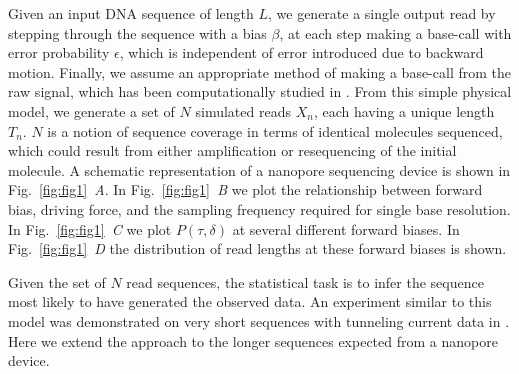 \documentclass{biophys_letter}
\newcommand{\bias}{\beta}
\newcommand{\err}{\epsilon}
\newcommand{\kje}[1]{\textcolor{BurntOrange}{#1}}
\begin{document}
\begin{multicols}{2}
Given an input DNA sequence of length $L$, we generate a single output read by stepping through the sequence with a bias $\bias$, at each step making a base-call with error probability $\err$, which is independent of error introduced due to backward motion.
Finally, we assume an appropriate method of making a base-call from the raw signal, which has been computationally studied in \cite{ODonnell:2013}.
From this simple physical model, we generate a set of $N$ simulated reads $X_n$, each having a unique length $T_{n}$.
$N$ is a notion of sequence coverage in terms of identical molecules sequenced, which could result from either amplification or resequencing of the initial molecule.
A schematic representation of a nanopore sequencing device is shown in Fig.~\ref{fig:fig1}\emph{~A}.
\kje{
In Fig.~\ref{fig:fig1}\emph{~B} we plot the relationship between forward bias, driving force, and the sampling frequency required for single base resolution.
In Fig.~\ref{fig:fig1}\emph{~C} we plot $P(\tau,\delta)$ at several different forward biases.
In Fig.~\ref{fig:fig1}\emph{~D} the distribution of read lengths at these forward biases is shown.
}

\end{multicols}
\twocolumn

Given the set of $N$ read sequences, the statistical task is to infer the sequence most likely to have generated the observed data.
An experiment similar to this model was demonstrated on very short sequences with tunneling current data in \cite{Ohshiro:2012}.
Here we extend the approach to the longer sequences expected from a nanopore device.
\end{document}
